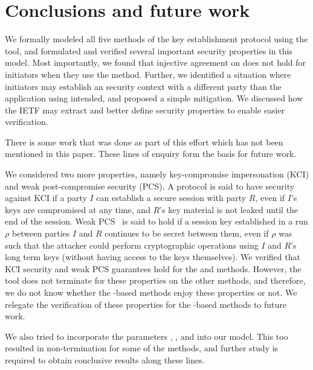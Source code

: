 \documentclass[runningheads, envcountsame, a4paper, draft, x11names]{llncs}
\begin{document}
\section{Conclusions and future work}
\label{sec:conclusions}
We formally modeled all five
methods of the \mEdhoc{} key establishment protocol using the \mTamarin{} tool, and 
%
formulated and verified several important security properties in this model.
%
%
Most importantly, we found that injective agreement on \mGiy{} does not hold for
initiators when they use the \mStat{} method.
%
Further, we identified a situation where initiators may establish an \mOscore{}
security context with a different party than the application using \mEdhoc{}
intended, and proposed a simple mitigation.
%
We discussed how the IETF may extract and better define security properties to
enable easier verification.
%

There is some work that was done as part of this effort which has not been mentioned in this paper. These lines of enquiry form the basis for future work.

We considered two more properties, namely key-compromise impersonation (KCI) and weak post-compromise security (PCS). A protocol is said to have security against KCI if a party $I$ can establish a secure session with party $R$, even if $I$'s keys are compromised at any time, and $R$'s key material is not leaked until the end of the session. Weak PCS~\cite{cohn2016post} is said to hold if a session key established in a run $\rho$ between parties $I$ and $R$ continues to be secret between them, even if $\rho$ was such that the attacker could perform cryptographic operations using $I$ and $R$'s long term keys (without having access to the keys themselves). We verified that KCI security and weak PCS guarantees hold for the \mSigSig{} and \mPskPsk{} methods. However, the tool does not terminate for these properties on the other methods, and therefore, we do not know whether the \mStat-based methods enjoy these properties or not. We relegate the verification of these properties for the \mStat-based methods to future work. 

We also tried to incorporate the parameters \mCi, \mCr, and \mAD{} into our model. This too resulted in non-termination for some of the methods, and further study is required to obtain conclusive results along these lines. 
\end{document}
